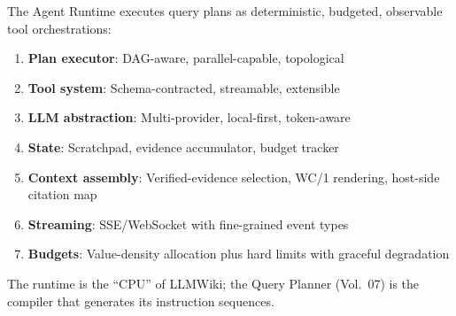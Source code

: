 The Agent Runtime executes query plans as deterministic, budgeted, observable tool orchestrations:
\begin{enumerate}
  \item \textbf{Plan executor}: DAG-aware, parallel-capable, topological
  \item \textbf{Tool system}: Schema-contracted, streamable, extensible
  \item \textbf{LLM abstraction}: Multi-provider, local-first, token-aware
  \item \textbf{State}: Scratchpad, evidence accumulator, budget tracker
  \item \textbf{Context assembly}: Verified-evidence selection, WC/1 rendering, host-side citation map
  \item \textbf{Streaming}: SSE/WebSocket with fine-grained event types
  \item \textbf{Budgets}: Value-density allocation plus hard limits with graceful degradation
\end{enumerate}
The runtime is the ``CPU'' of LLMWiki; the Query Planner (Vol.~07) is the compiler that generates its instruction sequences.

